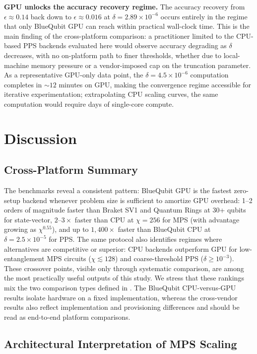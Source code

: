 \documentclass[conference,10pt]{IEEEtran}
\begin{document}
\textbf{GPU unlocks the accuracy recovery regime.} The accuracy recovery from $\epsilon \approx 0.14$ back down to $\epsilon \approx 0.016$ at $\delta = 2.89\times10^{-6}$ occurs entirely in the regime that only BlueQubit GPU can reach within practical wall-clock time. This is the main finding of the cross-platform comparison: a practitioner limited to the CPU-based PPS backends evaluated here would observe accuracy degrading as $\delta$ decreases, with no on-platform path to finer thresholds, whether due to local-machine memory pressure or a vendor-imposed cap on the truncation parameter. As a representative GPU-only data point, the $\delta = 4.5\times10^{-6}$ computation completes in ${\sim}12$ minutes on GPU, making the convergence regime accessible for iterative experimentation; extrapolating CPU scaling curves, the same computation would require days of single-core compute.

\section{Discussion}
\label{sec:discussion}

\subsection{Cross-Platform Summary}
 
The benchmarks reveal a consistent pattern: BlueQubit GPU is the fastest zero-setup backend whenever problem size is sufficient to amortize GPU overhead: 1--2 orders of magnitude faster than Braket SV1 and Quantum Rings at 30+ qubits for state-vector, $2\text{--}3\times$ faster than CPU at $\chi = 256$ for MPS (with advantage growing as $\chi^{0.55}$), and up to $1{,}400\times$ faster than BlueQubit CPU at $\delta = 2.5\times10^{-5}$ for PPS. The same protocol also identifies regimes where alternatives are competitive or superior: CPU backends outperform GPU for low-entanglement MPS circuits ($\chi \lesssim 128$) and coarse-threshold PPS ($\delta \geq 10^{-3}$). These crossover points, visible only through systematic comparison, are among the most practically useful outputs of this study. We stress that these rankings mix the two comparison types defined in . The BlueQubit CPU-versus-GPU results isolate hardware on a fixed implementation, whereas the cross-vendor results also reflect implementation and provisioning differences and should be read as end-to-end platform comparisons.

\subsection{Architectural Interpretation of MPS Scaling}
 
\end{document}
